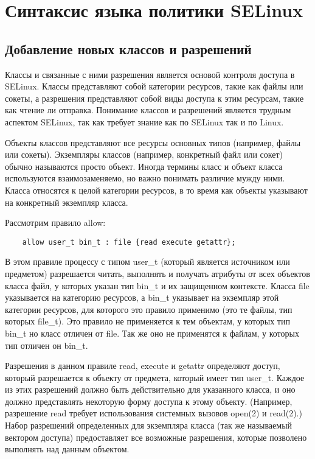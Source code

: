 \documentclass{./../class/UIR}
\begin{document}
\section{Синтаксис языка политики SELinux}
    \subsection{Добавление новых классов и разрешений}
    Классы и связанные с ними разрешения является основой контроля доступа в SELinux. Классы представляют собой категории ресурсов, такие как файлы или сокеты, а разрешения представляют собой виды доступа к этим ресурсам, такие как чтение ли отправка. Понимание классов и разрешений является трудным аспектом SELinux, так как требует знание как по SELinux так и по Linux.

	Объекты классов представляют все ресурсы основных типов (например, файлы или
	сокеты). Экземпляры классов (например, конкретный файл или сокет) обычно
	называются просто объект. Иногда термины класс и объект класса используются
	взаимозаменяемо, но важно понимать различие мужду ними. Класса относятся к
	целой категории ресурсов, в то время как объекты указывают на конкретный
	экземпляр класса.
	
	Рассмотрим правило allow:
	\begin{verbatim}
	allow user_t bin_t : file {read execute getattr};
	\end{verbatim}
	В этом правиле процессу с типом user\_t (который является источником или
	предметом) разрешается читать, выполнять и получать атрибуты от всех объектов
	класса файл, у которых указан тип bin\_t и их защищенном контексте. Класса file
	указывается на категорию ресурсов, а bin\_t указывает на экземпляр этой
	категории ресурсов, для которого это правило применимо (это те файлы, тип
	которых file\_t). Это правило не применяется к тем объектам, у которых тип
	bin\_t но класс отличен от file. Так же оно не применятся к файлам, у которых
	тип отличен он bin\_t.
	
	Разрешения в данном правиле read, execute и getattr определяют доступ, который
	разрешается к объекту от предмета, который имеет тип user\_t. Каждое из этих
	разрешений должно быть действительно для указанного класса, и оно должно
	представлять некоторую форму доступа к этому объекту. (Например, разрешение
	read требует использования системных вызовов open(2) и read(2).) Набор
	разрешений определенных для экземпляра класса (так же называемый вектором
	доступа) предоставляет все возможные разрешения, которые позволено выполнять
	над данным объектом.
	
\end{document}
